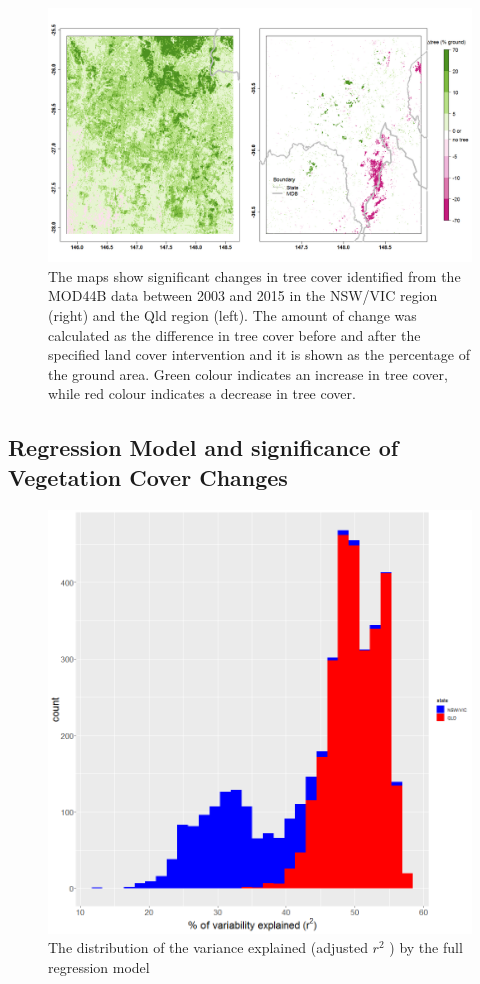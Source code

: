 \documentclass[fleqn,10pt,lineno]{wlpeerj} %
\begin{document}
\begin{figure}
\includegraphics[width=0.9\linewidth]{figures/tc_figs} \caption{The maps show significant changes in tree cover identified from the MOD44B data between 2003 and 2015 in the NSW/VIC region (right) and the Qld region (left). The amount of change was calculated as the difference in tree cover before and after the specified land cover intervention and it is shown as the percentage of the ground area. Green colour indicates an increase in tree cover, while red colour indicates a decrease in tree cover.}\label{fig:tctrend}
\end{figure}

\subsection{Regression Model and significance of Vegetation Cover
Changes}\label{regression-model-and-significance-of-vegetation-cover-changes}

\begin{figure}
\includegraphics[width=0.9\linewidth]{figures/rsq_fullmodel} \caption{The distribution of the variance explained (adjusted $r^2$ ) by the full regression model}\label{fig:rsqmodel}
\end{figure}
\end{document}
